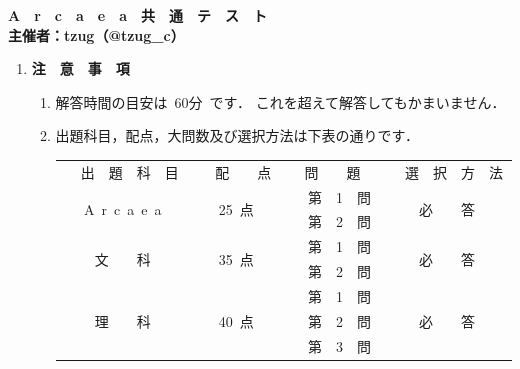

\begin{center}
\end{center}
\begin{center}
    {\huge \textbf{A　r　c　a　e　a　共　通　テ　ス　ト}}\\
    \vspace{1em}
    {\Large \textbf{主催者：tzug（@tzug\_c）}}
\end{center}
{\Large
\begin{enumerate}[I]
    \item \textbf{注　意　事　項}
    \begin{enumerate}[1]
        \item 解答時間の目安は~60分~です．
        これを超えて解答してもかまいません．
        \item 出題科目，配点，大問数及び選択方法は下表の通りです．\\

        \begin{table}[h]
            \centering
            \begin{tabular}{|c|c|c|c|}
                \hline
                \multirow{2}{*}{　出　題　科　目　} & \multirow{2}{*}{　配　　点　} &\multirow{2}{*}{問　　題} & \multirow{2}{*}{　選　択　方　法　} \\
                &&& \\ \hline
                \multirow{2}{*}{A~r~c~a~e~a} &\multirow{2}{*}{25~点} & 　第　1　問　 & \multirow{2}{*}{必　　答}\\  
                    \cline{3-3}
                    &&　第　2　問　& \\
                    \hline
                    \multirow{2}{*}{文　　科} &\multirow{2}{*}{35~点} &　第　1　問　 & \multirow{2}{*}{必　　答}\\
                    \cline{3-3}
                    &&　第　2　問　& \\
                    \hline
                    \multirow{3}{*}{理　　科} &\multirow{3}{*}{40~点} & 　第　1　問　 & \multirow{3}{*}{必　　答}\\
                    \cline{3-3}
                    &&　第　2　問　& \\
                    \cline{3-3}
                    &&　第　3　問　& \\
                    \hline
            \end{tabular}
        \end{table}


\end{enumerate}
\end{enumerate}}
